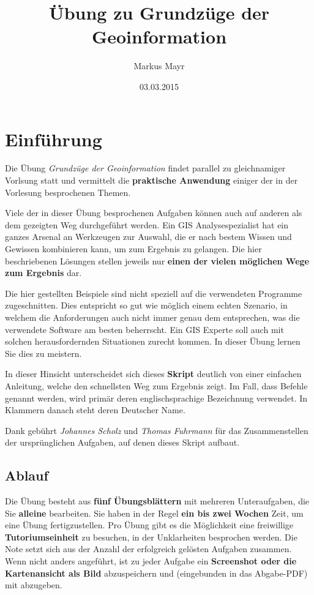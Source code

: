 \documentclass[a4paper,12pt,ngerman]{sphinxmanual}
\title{Übung zu Grundzüge der Geoinformation}
\date{03.03.2015}
\author{Markus Mayr}
\begin{document}
\maketitle
\tableofcontents
{}\label{index::doc}



\chapter{Einführung}
\label{intro:einfuhrung}\label{intro::doc}\label{intro:ubungsblatter-zu-grundzuge-der-geoinformation}
Die Übung \emph{Grundzüge der Geoinformation} findet parallel zu gleichnamiger Vorlsung statt und vermittelt die \textbf{praktische Anwendung} einiger der in der Vorlesung besprochenen Themen.

Viele der in dieser Übung besprochenen Aufgaben können auch auf anderen als dem gezeigten Weg durchgeführt werden. Ein GIS Analysespezialist hat ein ganzes Arsenal an Werkzeugen zur Auswahl, die er nach bestem Wissen und Gewissen kombinieren kann, um zum Ergebnis zu gelangen. Die hier beschriebenen Lösungen stellen jeweils nur \textbf{einen der vielen möglichen Wege zum Ergebnis} dar.

Die hier gestellten Beispiele sind nicht speziell auf die verwendeten Programme zugeschnitten. Dies entspricht so gut wie möglich einem echten Szenario, in welchem die Anforderungen auch nicht immer genau dem entsprechen, was die verwendete Software am besten beherrscht.
Ein GIS Experte soll auch mit solchen herausfordernden Situationen zurecht kommen. In dieser Übung lernen Sie dies zu meistern.

In dieser Hinsicht unterscheidet sich dieses \textbf{Skript} deutlich von einer einfachen Anleitung, welche den schnellsten Weg zum Ergebnis zeigt.
Im Fall, dass Befehle genannt werden, wird primär deren englischsprachige Bezeichnung verwendet. In Klammern danach steht deren Deutscher Name.

Dank gebührt \emph{Johannes Scholz} und \emph{Thomas Fuhrmann} für das Zusammenstellen der ursprünglichen Aufgaben, auf denen dieses Skript aufbaut.


\section{Ablauf}
\label{intro:ablauf}
Die Übung besteht aus \textbf{fünf Übungsblättern} mit mehreren Unteraufgaben, die Sie \textbf{alleine} bearbeiten.
Sie haben in der Regel \textbf{ein bis zwei Wochen} Zeit, um eine Übung fertigzustellen.
Pro Übung gibt es die Möglichkeit eine freiwillige \textbf{Tutoriumseinheit} zu besuchen, in der Unklarheiten besprochen werden.
Die Note setzt sich aus der Anzahl der erfolgreich gelösten Aufgaben zusammen.
Wenn nicht anders angeführt, ist zu jeder Aufgabe ein \textbf{Screenshot oder die Kartenansicht als Bild} abzuspeichern und (eingebunden in das Abgabe-PDF) mit abzugeben.
\end{document}
